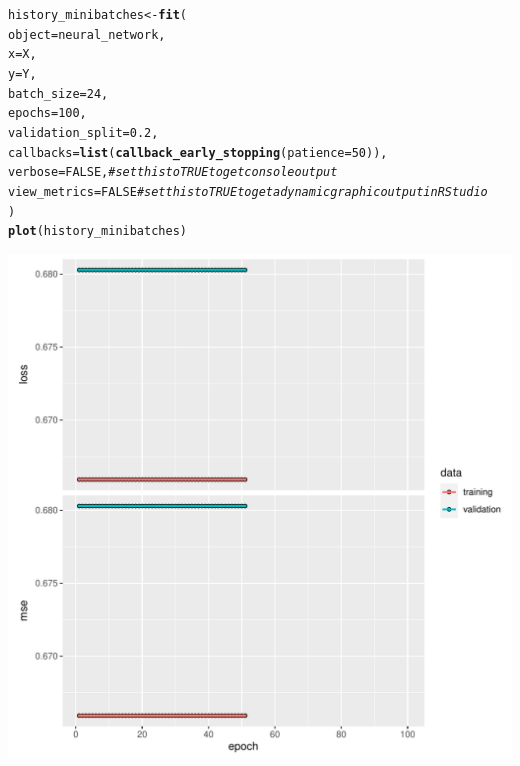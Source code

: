 \documentclass[a4paper]{article}
\makeatletter
\def\maxwidth{ %
  \ifdim\Gin@nat@width>\linewidth
    \linewidth
  \else
    \Gin@nat@width
  \fi
}
\newcommand{\hlnum}[1]{\textcolor[rgb]{0.686,0.059,0.569}{#1}}%
\newcommand{\hlcom}[1]{\textcolor[rgb]{0.678,0.584,0.686}{\textit{#1}}}%
\newcommand{\hlstd}[1]{\textcolor[rgb]{0.345,0.345,0.345}{#1}}%
\newcommand{\hlkwb}[1]{\textcolor[rgb]{0.69,0.353,0.396}{#1}}%
\newcommand{\hlkwc}[1]{\textcolor[rgb]{0.333,0.667,0.333}{#1}}%
\newcommand{\hlkwd}[1]{\textcolor[rgb]{0.737,0.353,0.396}{\textbf{#1}}}%
\newenvironment{kframe}{%
 \def\at@end@of@kframe{}%
 \ifinner\ifhmode%
  \def\at@end@of@kframe{\end{minipage}}%
  \begin{minipage}{\columnwidth}%
 \fi\fi%
 \def\FrameCommand##1{\hskip\@totalleftmargin \hskip-\fboxsep
 \colorbox{shadecolor}{##1}\hskip-\fboxsep
     \hskip-\linewidth \hskip-\@totalleftmargin \hskip\columnwidth}%
 \MakeFramed {\advance\hsize-\width
   \@totalleftmargin\z@ \linewidth\hsize
   \@setminipage}}%
 {\par\unskip\endMakeFramed%
 \at@end@of@kframe}
\newenvironment{knitrout}{}{} %
\makeatother
\begin{document}
{\begin{enumerate}
\begin{itemize}
\begin{knitrout}
\begin{kframe}
\begin{alltt}
\hlstd{history_minibatches} \hlkwb{<-} \hlkwd{fit}\hlstd{(}
  \hlkwc{object}           \hlstd{= neural_network,}
  \hlkwc{x}                \hlstd{= X,}
  \hlkwc{y}                \hlstd{= Y,}
  \hlkwc{batch_size}       \hlstd{=} \hlnum{24}\hlstd{,}
  \hlkwc{epochs}           \hlstd{=} \hlnum{100}\hlstd{,}
  \hlkwc{validation_split} \hlstd{=} \hlnum{0.2}\hlstd{,}
  \hlkwc{callbacks} \hlstd{=} \hlkwd{list}\hlstd{(}\hlkwd{callback_early_stopping}\hlstd{(}\hlkwc{patience} \hlstd{=} \hlnum{50}\hlstd{)),}
  \hlkwc{verbose} \hlstd{=} \hlnum{FALSE}\hlstd{,} \hlcom{# set this to TRUE to get console output}
  \hlkwc{view_metrics} \hlstd{=} \hlnum{FALSE} \hlcom{# set this to TRUE to get a dynamic graphic output in RStudio}
\hlstd{)}
\hlkwd{plot}\hlstd{(history_minibatches)}
\end{alltt}
\end{kframe}
\includegraphics[width=\maxwidth]{figure/unnamed-chunk-10-1} 
\end{knitrout}
\end{itemize}
\end{enumerate}
}
\end{document}
